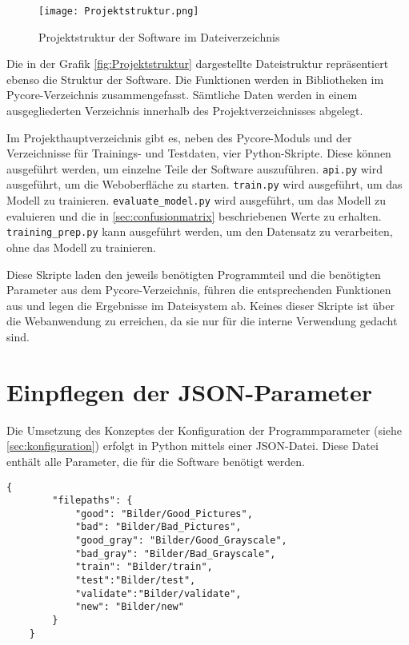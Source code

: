 \begin{figure}[H]
    \centering
    \texttt{[image: Projektstruktur.png]}
    \caption{Projektstruktur der Software im Dateiverzeichnis}
    \label{fig:Projektstruktur}
\end{figure}

Die in der Grafik \autoref{fig:Projektstruktur} dargestellte Dateistruktur repräsentiert ebenso die Struktur der Software. Die Funktionen werden in Bibliotheken im Pycore-Verzeichnis zusammengefasst. 
Sämtliche Daten werden in einem ausgegliederten Verzeichnis innerhalb des Projektverzeichnisses abgelegt. 

Im Projekthauptverzeichnis gibt es, neben des Pycore-Moduls und der Verzeichnisse für Trainings- und Testdaten, vier Python-Skripte. Diese können ausgeführt werden, um einzelne Teile der Software auszuführen.
\texttt{api.py} wird ausgeführt, um die Weboberfläche zu starten.
\texttt{train.py} wird ausgeführt, um das Modell zu trainieren.
\texttt{evaluate\_model.py} wird ausgeführt, um das Modell zu evaluieren und die in \autoref{sec:confusionmatrix} beschriebenen Werte zu erhalten. 
\texttt{training\_prep.py} kann ausgeführt werden, um den Datensatz zu verarbeiten, ohne das Modell zu trainieren.

Diese Skripte laden den jeweils benötigten Programmteil und die benötigten Parameter aus dem Pycore-Verzeichnis, führen die entsprechenden Funktionen aus und legen die Ergebnisse im Dateisystem ab.
Keines dieser Skripte ist über die Webanwendung zu erreichen, da sie nur für die interne Verwendung gedacht sind.

\section{Einpflegen der JSON-Parameter} \label{subsec:json_parameter}

Die Umsetzung des Konzeptes der Konfiguration der Programmparameter (siehe \autoref{sec:konfiguration}) erfolgt in Python mittels einer \ac{JSON}-Datei.
Diese Datei enthält alle Parameter, die für die Software benötigt werden.

\begin{lstlisting}[style=json, label=lst:json_example, caption={Beispiel einer \ac{JSON}-Datei mit Parametern des mobilnet Modells}]
    {
        "filepaths": {
            "good": "Bilder/Good_Pictures",
            "bad": "Bilder/Bad_Pictures",
            "good_gray": "Bilder/Good_Grayscale",
            "bad_gray": "Bilder/Bad_Grayscale",
            "train": "Bilder/train",
            "test":"Bilder/test",
            "validate":"Bilder/validate",
            "new": "Bilder/new"
        }
    }
\end{lstlisting}

